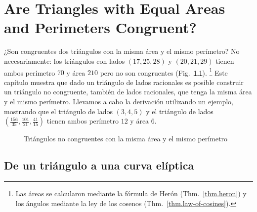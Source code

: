 
\chapter{Are Triangles with Equal Areas and Perimeters Congruent?}\label{c.congruent}


¿Son congruentes dos triángulos con la misma área y el mismo perímetro? No necesariamente: los triángulos con lados $(17,25,28)$ y $(20,21,29)$ tienen ambos perímetro $70$ y área $210$ pero no son congruentes (Fig.~\ref{f.congruent-first-example}). \footnote{Las áreas se calcularon mediante la fórmula de Herón (Thm.~\ref{thm.heron}) y los ángulos mediante la ley de los cosenos (Thm.~\ref{thm.law-of-cosines}).} Este capítulo muestra que dado un triángulo de lados racionales es posible construir un triángulo no congruente, también de lados racionales, que tenga la misma área y el mismo perímetro.
Llevamos a cabo la derivación utilizando un ejemplo, mostrando que el triángulo de lados $(3,4,5)$ y el triángulo de lados 
$\left(\frac{156}{35}, \frac{101}{21}, \frac{41}{15}\right)$ tienen ambos perímetro $12$ y área $6$.

\begin{figure}[b]
\begin{center}
\end{center}
\caption{Triángulos no congruentes con la misma área y el mismo perímetro}\label{f.congruent-first-example}
\end{figure}

\section{De un triángulo a una curva elíptica}\label{s.elliptic}

